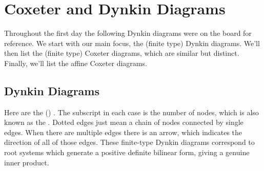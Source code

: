 \section{Coxeter and Dynkin Diagrams}
Throughout the first day the following Dynkin diagrams were on the board for reference.
We start with our main focus, the (finite type) Dynkin diagrams.
We'll then list the (finite type) Coxeter diagrams, which are similar but distinct.
Finally, we'll list the affine Coxeter diagrams.

\subsection{Dynkin Diagrams}
Here are the () .
The subscript in each case is the number of nodes, which is also known as the .
Dotted edges just mean a chain of nodes connected by single edges.
When there are multiple edges there is an arrow, which indicates the direction of all of those edges.
These finite-type Dynkin diagrams correspond to root systems which generate a positive definite bilinear form, giving a genuine inner product.
\begingroup
\allowdisplaybreaks
